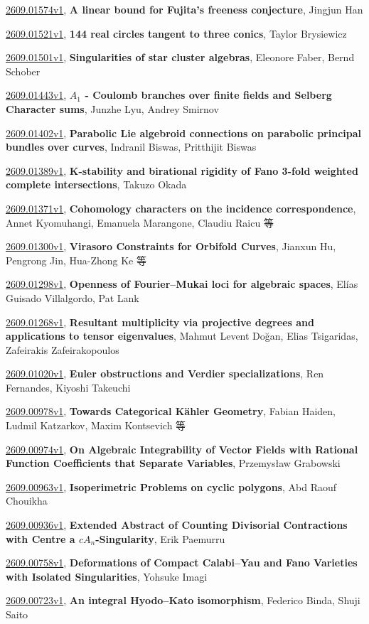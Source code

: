 \documentclass[9pt, a4paper]{article}
\theoremstyle{plain}
\theoremstyle{definition}
\theoremstyle{remark}
\newcommand{\arxiv}[3]{\href{https://arxiv.org/abs/#1}{#1}, \textbf{\textcolor{arxivblue}{#2}}, #3}
\begin{document}
\arxiv{2609.01574v1}{A linear bound for Fujita's freeness conjecture}{Jingjun Han}

\arxiv{2609.01521v1}{144 real circles tangent to three conics}{Taylor Brysiewicz}

\arxiv{2609.01501v1}{Singularities of star cluster algebras}{Eleonore Faber, Bernd Schober}

\arxiv{2609.01443v1}{$A_1$ - Coulomb branches over finite fields and Selberg Character sums}{Junzhe Lyu, Andrey Smirnov}

\arxiv{2609.01402v1}{Parabolic Lie algebroid connections on parabolic principal bundles over curves}{Indranil Biswas, Pritthijit Biswas}

\arxiv{2609.01389v1}{K-stability and birational rigidity of Fano 3-fold weighted complete intersections}{Takuzo Okada}

\arxiv{2609.01371v1}{Cohomology characters on the incidence correspondence}{Annet Kyomuhangi, Emanuela Marangone, Claudiu Raicu 等}

\arxiv{2609.01300v1}{Virasoro Constraints for Orbifold Curves}{Jianxun Hu, Pengrong Jin, Hua-Zhong Ke 等}

\arxiv{2609.01298v1}{Openness of Fourier--Mukai loci for algebraic spaces}{Elías Guisado Villalgordo, Pat Lank}

\arxiv{2609.01268v1}{Resultant multiplicity via projective degrees and applications to tensor eigenvalues}{Mahmut Levent Doğan, Elias Tsigaridas, Zafeirakis Zafeirakopoulos}

\arxiv{2609.01020v1}{Euler obstructions and Verdier specializations}{Ren Fernandes, Kiyoshi Takeuchi}

\arxiv{2609.00978v1}{Towards Categorical Kähler Geometry}{Fabian Haiden, Ludmil Katzarkov, Maxim Kontsevich 等}

\arxiv{2609.00974v1}{On Algebraic Integrability of Vector Fields with Rational Function Coefficients that Separate Variables}{Przemysław Grabowski}

\arxiv{2609.00963v1}{Isoperimetric Problems on cyclic polygons}{Abd Raouf Chouikha}

\arxiv{2609.00936v1}{Extended Abstract of Counting Divisorial Contractions with Centre a $cA_n$-Singularity}{Erik Paemurru}

\arxiv{2609.00758v1}{Deformations of Compact Calabi--Yau and Fano Varieties with Isolated Singularities}{Yohsuke Imagi}

\arxiv{2609.00723v1}{An integral Hyodo--Kato isomorphism}{Federico Binda, Shuji Saito}
\end{document}
